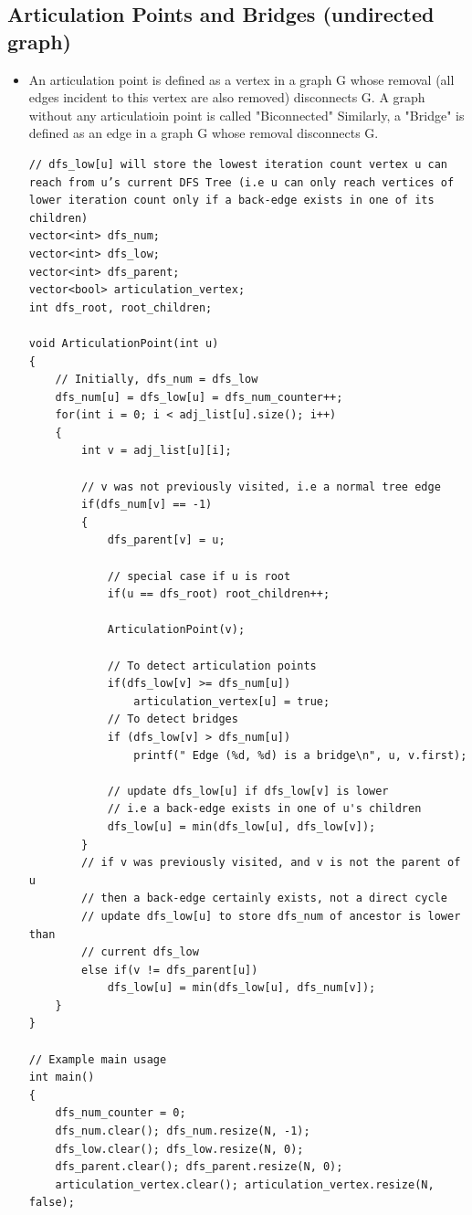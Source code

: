 \documentclass[8pt, a4paper, oneside, twocolumn]{extarticle}
\begin{document}
\subsection{Articulation Points and Bridges (undirected graph)}
\begin{itemize}
    \item An articulation point is defined as a vertex in a graph G whose removal (all edges incident to this vertex are also removed) disconnects G. A graph without any articulatioin point is called "Biconnected" Similarly, a "Bridge" is defined as an edge in a graph G whose removal disconnects G.
    \begin{verbatim}
// dfs_low[u] will store the lowest iteration count vertex u can reach from u’s current DFS Tree (i.e u can only reach vertices of lower iteration count only if a back-edge exists in one of its children)
vector<int> dfs_num;
vector<int> dfs_low;
vector<int> dfs_parent;
vector<bool> articulation_vertex;
int dfs_root, root_children;

void ArticulationPoint(int u)
{
    // Initially, dfs_num = dfs_low
    dfs_num[u] = dfs_low[u] = dfs_num_counter++;
    for(int i = 0; i < adj_list[u].size(); i++)
    {
        int v = adj_list[u][i];
        
        // v was not previously visited, i.e a normal tree edge
        if(dfs_num[v] == -1)
        {
            dfs_parent[v] = u;
            
            // special case if u is root
            if(u == dfs_root) root_children++;

            ArticulationPoint(v);
            
            // To detect articulation points
            if(dfs_low[v] >= dfs_num[u])
                articulation_vertex[u] = true;
            // To detect bridges
            if (dfs_low[v] > dfs_num[u])
                printf(" Edge (%d, %d) is a bridge\n", u, v.first);
            
            // update dfs_low[u] if dfs_low[v] is lower
            // i.e a back-edge exists in one of u's children
            dfs_low[u] = min(dfs_low[u], dfs_low[v]);
        }
        // if v was previously visited, and v is not the parent of u
        // then a back-edge certainly exists, not a direct cycle
        // update dfs_low[u] to store dfs_num of ancestor is lower than
        // current dfs_low
        else if(v != dfs_parent[u])
            dfs_low[u] = min(dfs_low[u], dfs_num[v]);
    }
}

// Example main usage
int main() 
{
    dfs_num_counter = 0;
    dfs_num.clear(); dfs_num.resize(N, -1);
    dfs_low.clear(); dfs_low.resize(N, 0);
    dfs_parent.clear(); dfs_parent.resize(N, 0);
    articulation_vertex.clear(); articulation_vertex.resize(N, false);


\end{verbatim}
\end{itemize}
\end{document}
